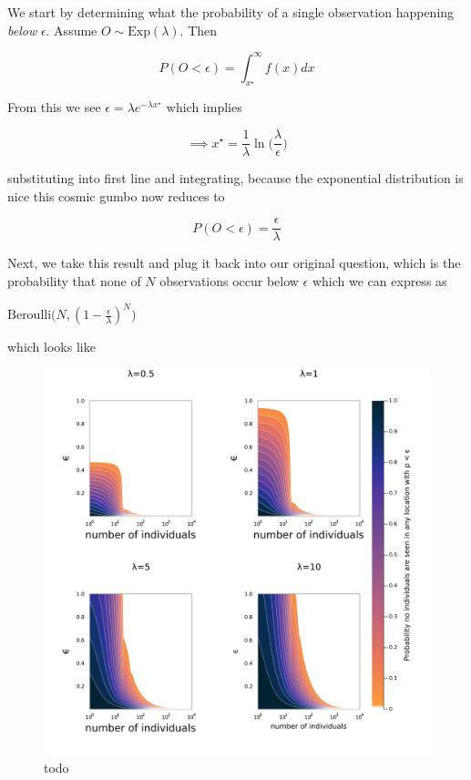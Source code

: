 \documentclass[11pt]{article}
\makeatletter
\def\maxwidth{\ifdim\Gin@nat@width>\linewidth\linewidth
\else\Gin@nat@width\fi}
\let\Oldincludegraphics\includegraphics
\renewcommand{\includegraphics}[1]{\Oldincludegraphics[width=\maxwidth]{#1}}
\makeatother
\begin{document}
We start by determining what the probability of a single observation
happening \emph{below} \(\epsilon\). Assume
\(O \sim \text{Exp}(\lambda)\). Then

\[P(O < \epsilon) = \int_{x^\star}^\infty f(x) dx\]

From this we see \(\epsilon = \lambda e^{-\lambda x^\star}\) which
implies

\[\implies x^\star = \frac{1}{\lambda}\ln \bigg(\frac{\lambda}{\epsilon} \bigg)\]

substituting into first line and integrating, because the exponential
distribution is nice this cosmic gumbo now reduces to

\[P(O < \epsilon) = \frac{\epsilon}{\lambda}\]

Next, we take this result and plug it back into our original question,
which is the probability that none of \(N\) observations occur below
\(\epsilon\) which we can express as

\(\text{Beroulli}\big(N, (1 - \frac{\epsilon}{\lambda})^N\big)\)

which looks like

\begin{figure}
\hypertarget{fig:neato}{%
\centering
\includegraphics{./figures/neat.png}
\caption{todo}\label{fig:neato}
}
\end{figure}
\end{document}
